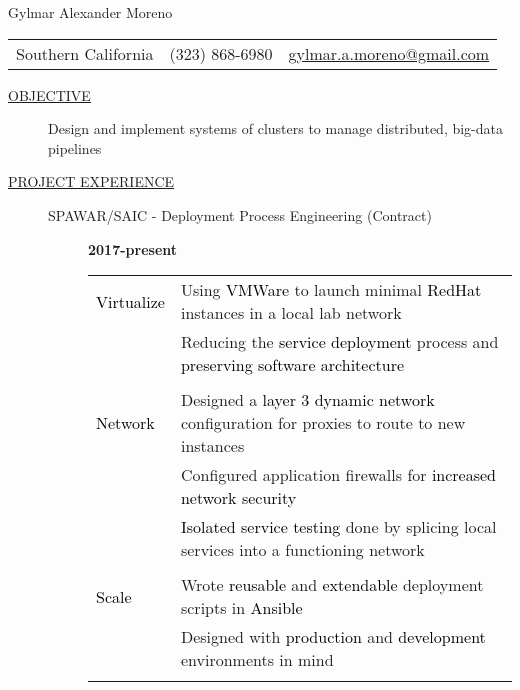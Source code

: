 \documentclass[12pt]{article}
\begin{document}
    \begin{center}
        {\LARGE Gylmar Alexander Moreno}
	\\
        \begin{tabular}{l|l|l}
            Southern California 
            & (323) 868-6980 
            & \href{mailto:gylmar.a.moreno@gmail.com}{gylmar.a.moreno@gmail.com}
        \end{tabular}
    \end{center}

    \begin{description}
        \item[\underline{OBJECTIVE}] Design and implement systems of clusters to manage distributed, big-data pipelines
        \item[\underline{PROJECT EXPERIENCE}] \hfill
            \begin{description}
                \item[SPAWAR/SAIC - Deployment Process Engineering (Contract)] \hfill \textbf{2017-present}\\
                \textcolor{gray}{
                    \begin{tabular}{l|l}
                        \\[-1.0mm]
                        \textcolor{black}{Virtualize}
                            & Using \textcolor{black}{VMWare} to launch minimal \textcolor{black}{RedHat} instances in a local lab network\\
                            & Reducing the \textcolor{black}{service deployment} process and \textcolor{black}{preserving software architecture}\\
                        \\[-1.7mm]
                        \textcolor{black}{Network}
                            & Designed a \textcolor{black}{layer 3 dynamic network} configuration for proxies to route to new instances\\
                            & Configured application firewalls for \textcolor{black}{increased network security}\\
                            & \textcolor{black}{Isolated service testing} done by splicing local services into a functioning network\\
                        \\[-1.7mm]
                        \textcolor{black}{Scale}
                            & Wrote \textcolor{black}{reusable} and \textcolor{black}{extendable} deployment scripts in \textcolor{black}{Ansible}\\
                            & Designed with \textcolor{black}{production} and \textcolor{black}{development} environments in mind\\
                        \\[-1.0mm]
                    \end{tabular}
                }


\end{description}
\end{description}
\end{document}
